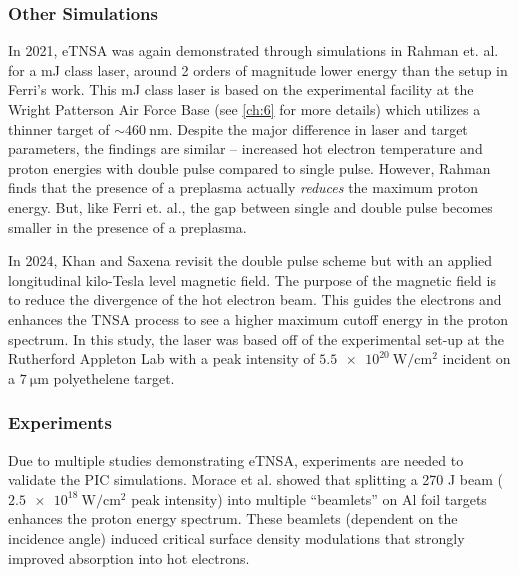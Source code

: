 \subsubsection{Other Simulations}
In 2021, eTNSA was again demonstrated through simulations in Rahman et. al.\cite{Rahman_2021_PoP} for a mJ class laser, around 2 orders of magnitude lower energy than the setup in Ferri's work. This mJ class laser is based on the experimental facility at the Wright Patterson Air Force Base (see \cref{ch:6} for more details) which utilizes a thinner target of $\sim \SI{460}{\nano \meter}$. Despite the major difference in laser and target parameters, the findings are similar -- increased hot electron temperature and proton energies with double pulse compared to single pulse. However, Rahman finds that the presence of a preplasma actually \emph{reduces} the maximum proton energy. But, like Ferri et. al., the gap between single and double pulse becomes smaller in the presence of a preplasma.

In 2024, Khan and Saxena\cite{Khan_2024_NJoP} revisit the double pulse scheme but with an applied longitudinal kilo-Tesla level magnetic field. The purpose of the magnetic field is to reduce the divergence of the hot electron beam. This guides the electrons and enhances the TNSA process to see a higher maximum cutoff energy in the proton spectrum\cite{Arefiev_2016_NJoP}. In this study, the laser was based off of the experimental set-up at the Rutherford Appleton Lab with a peak intensity of $\SI{5.5e20}{\watt \per \centi \meter \squared}$ incident on a $\SI{7}{\micro \meter}$ polyethelene target. 


\subsubsection{Experiments}

Due to multiple studies demonstrating eTNSA\cite{Ferri_2019_Nat_Comm,Rahman_2021_PoP,Khan_2024_NJoP}, experiments are needed to validate the PIC simulations. Morace et al.\cite{Morace_2019_Nat_Comm} showed that splitting a 270 J beam ($\SI{2.5e18}{\watt \per \centi \meter \squared}$ peak intensity) into multiple ``beamlets'' on Al foil targets enhances the proton energy spectrum. These beamlets (dependent on the incidence angle) induced critical surface density modulations that strongly improved absorption into hot electrons. 

